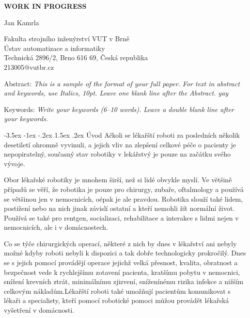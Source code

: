 \documentclass[a4paper,12pt]{article}
\makeatletter
\theoremstyle{definition}
\renewcommand\section{\@startsection {section}{1}{\z@}%
                                   {-3.5ex \@plus -1ex \@minus -.2ex}%
                                   {1.5ex \@plus.2ex}%
                                   {\large\bfseries}}
\makeatother
\begin{document}
\pagestyle{empty}

\begin{center}
{\bf \Large WORK IN PROGRESS}
\end{center}

\smallskip
\begin{center}
{\large Jan Kamrla}
\end{center}

\smallskip
\begin{center}
Fakulta strojního inženýrství VUT v Brně\\
Ústav automatizace a informatiky\\
Technická 2896/2, Brno 616 69, Česká republika\\
213005@vutbr.cz\\
\end{center}

\bigskip
\noindent Abstract: \textit{This is a sample of the format of your
full paper. For text in abstract and keywords, use Italics, 10pt. Leave one blank line after the Abstract. yay}

\vspace*{10pt} \noindent Keywords: \textit{Write your keywords (6--10 words).
Leave a double blank line after your keywords.}

\bigskip
\section{Úvod}
Ačkoli se lékařští roboti za posledních několik desetiletí ohromně vyvinuli, a jejich
vliv na zlepšení celkové péče o pacienty je nepopiratelný, současný stav robotiky v lekářstvý je pouze na začátku svého vývoje.

Obor lékařské robotiky je mnohem širší, než si lidé obvykle myslí. Ve většině případů se věří, že robotika je pouze pro chirurgy, zubaře, oftalmology a používá se většinou jen v nemocnicích, oépak je ale pravdou. Robotika slouží také lidem, postižení nebo na nich jinak závislí ostatní a kteří nemohli žít normální život. Používá se také pro rentgen, socializaci, rehabilitace a interakce s lidmi nejen v nemocnicích, ale i v domácnostech.

Co se týče chirurgických operací, některé z nich by dnes v lékařství ani nebyly možné kdyby
roboti nebyli k dispozici a tak dobře technologicky prokročilý. Dnes se s jejich pomocí provádějí operace jejichž velká přesnost, kvalita, obratnost a bezpečnost vede k rychlejšímu zotavení pacienta, kratšímu pobytu v nemocnici, snížení krevních ztrát, minimálnímu zjizvení, sníženínému rizika infekce a nižším celkovým nákladům.Lékařští roboti také umožňují pacientům komunikovat s lékaři a specialisty, kteří pomocí robotické pomoci můžou provádět lékařská vyšetření v domácnosti.
\end{document}
